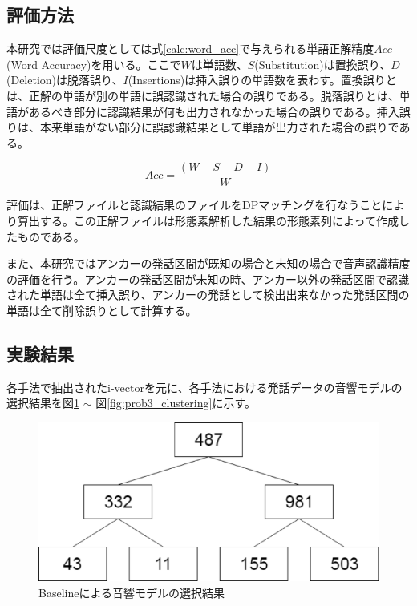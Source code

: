 \subsection{評価方法}
本研究では評価尺度としては式\ref{calc:word_acc}で与えられる単語正解精度$Acc$(Word Accuracy)を用いる。ここで$W$は単語数、$S$(Substitution)は置換誤り、$D$(Deletion)は脱落誤り、$I$(Insertions)は挿入誤りの単語数を表わす。置換誤りとは、正解の単語が別の単語に誤認識された場合の誤りである。脱落誤りとは、単語があるべき部分に認識結果が何も出力されなかった場合の誤りである。挿入誤りは、本来単語がない部分に誤認識結果として単語が出力された場合の誤りである。

\begin{equation}
\label{calc:word_acc}
Acc=\frac{(W-S-D-I)}{W}
\end{equation}

          
評価は、正解ファイルと認識結果のファイルをDPマッチングを行なうことにより算出する。この正解ファイルは形態素解析した結果の形態素列によって作成したものである。


また、本研究ではアンカーの発話区間が既知の場合と未知の場合で音声認識精度の評価を行う。アンカーの発話区間が未知の時、アンカー以外の発話区間で認識された単語は全て挿入誤り、アンカーの発話として検出出来なかった発話区間の単語は全て削除誤りとして計算する。

\subsection{実験結果}
各手法で抽出されたi-vectorを元に、各手法における発話データの音響モデルの選択結果を図\ref{fig:baseline_clustering} $\sim$ 図\ref{fig:prob3_clustering}に示す。

\begin{figure}[H]
  \begin{center}
    \includegraphics[scale=0.5]{./figure/baseline_clustering.eps}
  \end{center}
  \caption{Baselineによる音響モデルの選択結果 \label{fig:baseline_clustering}}
\end{figure}

